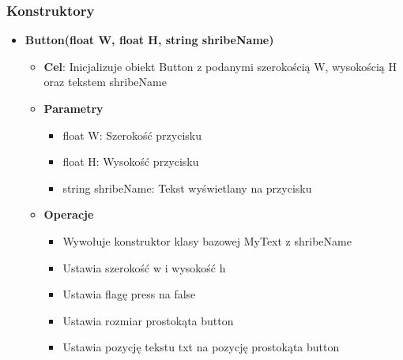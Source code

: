 \documentclass[a4paper, 10pt]{article}
\begin{document}
\subsubsection{Konstruktory}
\begin{itemize}
	\item \textbf{Button(float W, float H, string shribeName)}
		\begin{itemize}
			\item \textbf{Cel}: Inicjalizuje obiekt Button z podanymi szerokością W, wysokością H oraz tekstem shribeName
			\item \textbf{Parametry}
				\begin{itemize}
					\item float W: Szerokość przycisku
					\item float H: Wysokość przycisku
					\item string shribeName: Tekst wyświetlany na przycisku
				\end{itemize}
			\item \textbf{Operacje}
				\begin{itemize}
					\item Wywołuje konstruktor klasy bazowej MyText z shribeName
					\item Ustawia szerokość w i wysokość h
					\item Ustawia flagę press na false
					\item Ustawia rozmiar prostokąta button
					\item Ustawia pozycję tekstu txt na pozycję prostokąta button
				\end{itemize}
		\end{itemize}
\end{itemize}
\end{document}
